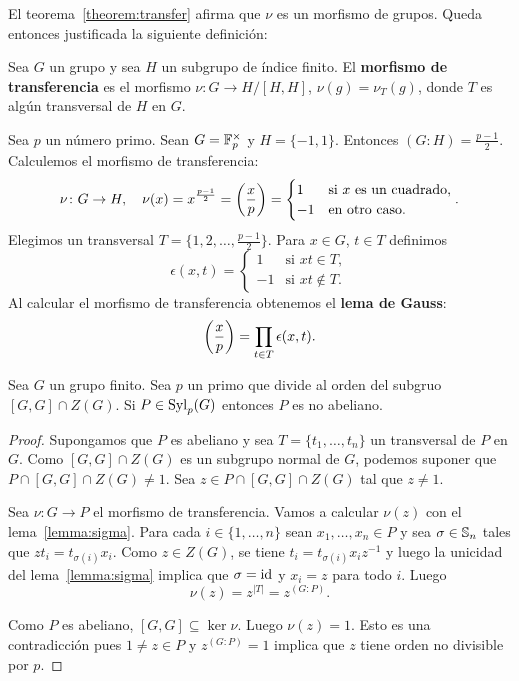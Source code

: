 El teorema~\ref{theorem:transfer} afirma que $\nu$ es un morfismo de grupos.
Queda entonces justificada la siguiente definición:

\begin{definition}
	Sea $G$ un grupo y sea $H$ un subgrupo de índice finito. El
	\textbf{morfismo de transferencia} es el morfismo $\nu\colon G\to H/[H,H]$,
	$\nu(g)=\nu_T(g)$, donde $T$ es algún transversal de $H$ en $G$.
\end{definition}

\begin{example}
	Sea $p$ un número primo. Sean $G=\mathbb{F}_p^\times$ y $H=\{-1,1\}$. Entonces
	$(G:H)=\frac{p-1}{2}$. Calculemos el morfismo de transferencia:
	\[
		\nu\colon G\to H,\quad
		\nu(x)=x^{\frac{p-1}{2}}=\left(\frac{x}{p}\right)=\begin{cases}
			1 & \text{si $x$ es un cuadrado},\\
			-1 & \text{en otro caso}.
		\end{cases}.
	\]
	Elegimos un transversal $T=\{1,2,\dots,\frac{p-1}{2}\}$. Para $x\in G$, $t\in T$ definimos
	\[
	\epsilon(x,t)=\begin{cases}
		1 & \text{si $xt\in T$},\\
		-1 & \text{si $xt\not\in T$}.
	\end{cases}
	\]
	Al calcular el morfismo de transferencia obtenemos el \textbf{lema de
	Gauss}:
	\[
	\left(\frac{x}{p}\right)=\prod_{t\in T}\epsilon(x,t).
	\]
\end{example}

\begin{theorem}
	\label{theorem:P_noabeliano}
	Sea $G$ un grupo finito. Sea $p$ un primo que divide al orden del subgruo $[G,G]\cap
	Z(G)$. Si $P\in\mathrm{Syl}_p(G)$ entonces $P$ es no abeliano.
\end{theorem}

\begin{proof}
	Supongamos que $P$ es abeliano y sea $T=\{t_1,\dots,t_n\}$ un transversal
	de $P$ en $G$. Como $[G,G]\cap Z(G)$ es un subgrupo normal de $G$, podemos
	suponer que $P\cap [G,G]\cap Z(G)\ne1$. Sea $z\in P\cap [G,G]\cap Z(G)$ tal
	que $z\ne1$. 

	Sea $\nu\colon G\to P$ el morfismo de transferencia. Vamos a calcular
	$\nu(z)$ con el lema~\ref{lemma:sigma}. Para cada $i\in\{1,\dots,n\}$ sean
	$x_1,\dots,x_n\in P$ y sea $\sigma\in\mathbb{S}_n$ tales que
	$zt_i=t_{\sigma(i)}x_i$. Como $z\in Z(G)$, se tiene
	$t_i=t_{\sigma(i)}x_iz^{-1}$ y luego la unicidad del lema~\ref{lemma:sigma}
	implica que $\sigma=\operatorname{id}$ y $x_i=z$ para todo $i$. Luego 
	\[
	\nu(z)=z^{|T|}=z^{(G:P)}. 
	\]

	Como $P$ es abeliano, $[G,G]\subseteq\ker\nu$. Luego $\nu(z)=1$. Esto es
	una contradicción pues $1\ne z\in P$ y $z^{(G:P)}=1$ implica que $z$ tiene
	orden no divisible por $p$. 
\end{proof}

